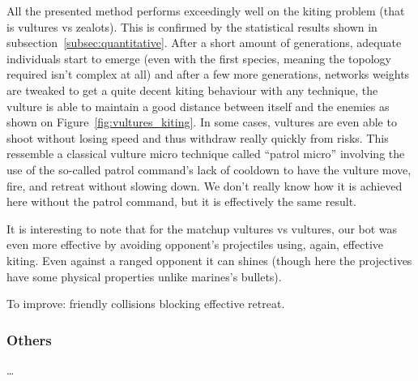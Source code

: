 All the presented method performs exceedingly well on the kiting problem (that is vultures vs zealots).
This is confirmed by the statistical results shown in subsection~\ref{subsec:quantitative}. After a short amount of generations, adequate
individuals start to emerge (even with the first species, meaning the topology required isn’t complex at all)
and after a few more generations, networks weights are tweaked to get a quite decent kiting behaviour with any
technique, the vulture is able to maintain a good distance between itself and the enemies as shown on
Figure~\ref{fig:vultures_kiting}. In some cases, vultures are even able to shoot without
losing speed and thus withdraw really quickly from risks. This ressemble
a classical vulture micro technique called “patrol micro” involving the use of the so-called patrol command's
lack of cooldown to have the vulture move, fire, and retreat without slowing down. We don’t really know how it
is achieved here without the patrol command, but it is effectively the same result.

It is interesting to note that for the matchup vultures vs vultures, our bot was even more effective by avoiding opponent's
projectiles using, again, effective kiting. Even against a ranged opponent it can shines (though here the projectives have
some physical properties unlike marines's bullets).

To improve: friendly collisions blocking effective retreat.

\subsubsection{Others}

…

